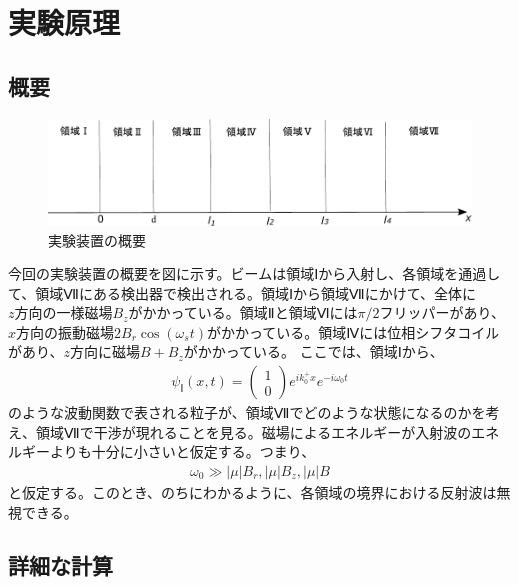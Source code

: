 \section{実験原理}
\subsection{概要}
\begin{figure}[h]
\begin{center}
\includegraphics[width=13cm]{pi2flipper/zenntaizu.pdf}
\caption{実験装置の概要}
\end{center}
\end{figure}
今回の実験装置の概要を図に示す。ビームは領域Ⅰから入射し、各領域を通過して、領域Ⅶにある検出器で検出される。領域Ⅰから領域Ⅶにかけて、全体に$z方向の一様磁場B_{z}$がかかっている。領域Ⅱと領域Ⅵには$\pi/2フリッパー$があり、$x方向の振動磁場2B_{r}\cos(\omega_{s}t)$がかかっている。領域Ⅳには位相シフタコイルがあり、$z方向に磁場B+B_{z}$がかかっている。
ここでは、領域Ⅰから、
\begin{align}
{\psi}_{Ⅰ}(x,t)=
\begin{pmatrix}
1 \\
0
\end{pmatrix}
e^{ik_{0}^{+}x}e^{-i\omega_{0}t}
\end{align}
のような波動関数で表される粒子が、領域Ⅶでどのような状態になるのかを考え、領域Ⅶで干渉が現れることを見る。磁場によるエネルギーが入射波のエネルギーよりも十分に小さいと仮定する。つまり、
\begin{align}
\omega_{0} \gg |{\mu}|B_{r},  |{\mu}|B_{z},  |{\mu}|B
\end{align}
と仮定する。このとき、のちにわかるように、各領域の境界における反射波は無視できる。
\subsection{詳細な計算}
